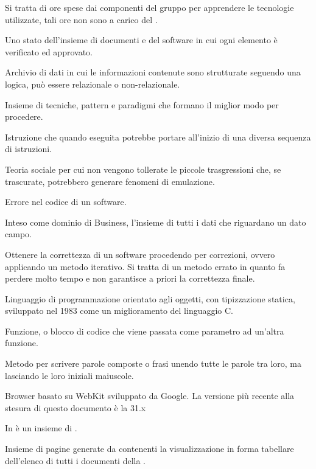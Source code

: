 Si tratta di ore spese dai componenti del gruppo per apprendere le tecnologie utilizzate, tali ore non sono a carico del .


Uno stato dell'insieme di documenti e del software in cui ogni elemento è verificato ed approvato.

Archivio di dati in cui le informazioni contenute sono strutturate seguendo una logica, può essere relazionale o non-relazionale.

Insieme di tecniche, pattern e paradigmi che formano il miglior modo per procedere.

Istruzione che quando eseguita potrebbe portare all'inizio di una diversa sequenza di istruzioni.

Teoria sociale per cui non vengono tollerate le piccole trasgressioni che, se trascurate, potrebbero generare fenomeni di emulazione. 

Errore nel codice di un software.

Inteso come dominio di Business, l'insieme di tutti i dati che riguardano un dato campo.

Ottenere la correttezza di un software procedendo per correzioni, ovvero applicando un metodo iterativo. Si tratta di un metodo errato in quanto fa perdere molto tempo e non garantisce a priori la correttezza finale.


Linguaggio di programmazione orientato agli oggetti, con tipizzazione statica, sviluppato nel 1983 come un miglioramento del linguaggio C.

Funzione, o blocco di codice che viene passata come parametro ad un'altra funzione.

Metodo per scrivere parole composte o frasi unendo tutte le parole tra loro, ma lasciando le loro iniziali maiuscole.

Browser basato su WebKit sviluppato da Google. La versione più recente alla stesura di questo documento è la 31.x

In  è un insieme di .

Insieme di pagine generate da \ProjectName{} contenenti la visualizzazione in forma tabellare dell'elenco di tutti i documenti della  .


